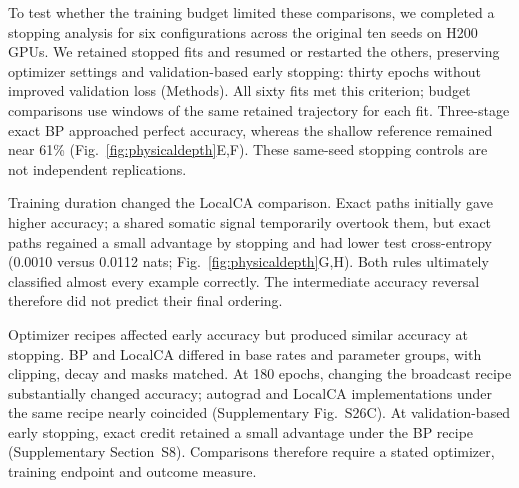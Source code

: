 \documentclass[11pt]{article}
\begin{document}
To test whether the training budget limited these comparisons, we completed a stopping analysis for six configurations across the original ten seeds on H200 GPUs. We retained stopped fits and resumed or restarted the others, preserving optimizer settings and validation-based early stopping: thirty epochs without improved validation loss (Methods). All sixty fits met this criterion; budget comparisons use windows of the same retained trajectory for each fit. Three-stage exact BP approached perfect accuracy, whereas the shallow reference remained near 61\% (Fig.~\ref{fig:physicaldepth}E,F). These same-seed stopping controls are not independent replications.

Training duration changed the LocalCA comparison. Exact paths initially gave higher accuracy; a shared somatic signal temporarily overtook them, but exact paths regained a small advantage by stopping and had lower test cross-entropy (0.0010 versus 0.0112 nats; Fig.~\ref{fig:physicaldepth}G,H). Both rules ultimately classified almost every example correctly. The intermediate accuracy reversal therefore did not predict their final ordering.

Optimizer recipes affected early accuracy but produced similar accuracy at stopping. BP and LocalCA differed in base rates and parameter groups, with clipping, decay and masks matched. At 180 epochs, changing the broadcast recipe substantially changed accuracy; autograd and LocalCA implementations under the same recipe nearly coincided (Supplementary Fig.~S26C). At validation-based early stopping, exact credit retained a small advantage under the BP recipe (Supplementary Section~S8). Comparisons therefore require a stated optimizer, training endpoint and outcome measure.
\end{document}
